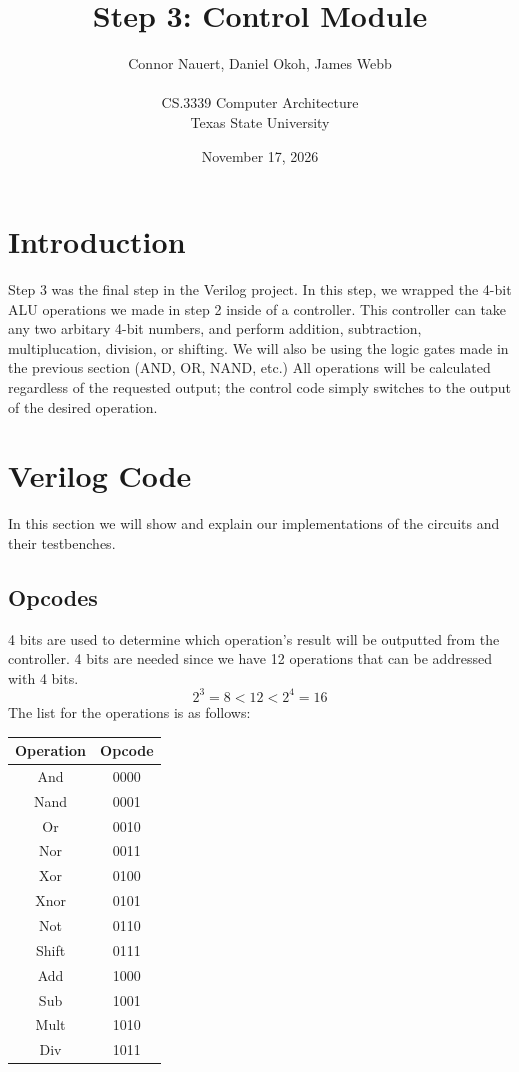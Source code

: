 \documentclass[12pt]{article}
\title{Step 3: Control Module}
\author{Connor Nauert, Daniel Okoh, James Webb\\
\AND\\
\AND
\AND
\AND
\AND
	CS.3339 Computer Architecture\\
\AND
	Texas State University\\
}
\date{November 17, 2026}
\begin{document}
\maketitle
\newpage
\thispagestyle{empty}


\newpage
\setcounter{page}{1}
\section{Introduction}
Step 3 was the final step in the Verilog project. In this step, we wrapped the
4-bit ALU operations we made in step 2 inside of a controller. This controller
can take any two arbitary 4-bit numbers, and perform addition, subtraction,
multiplucation, division, or shifting. We will also be using the logic gates
made in the previous section (AND, OR, NAND, etc.) All operations will
be calculated regardless of the requested output; the control code simply
switches to the output of the desired operation.

\section{Verilog Code}

In this section we will show and explain our implementations of the circuits and their testbenches.
\subsection{Opcodes}
4 bits are used to determine which operation's result will be outputted from the controller.
4 bits are needed since we have 12 operations that can be addressed with 4 bits.
$$2^3=8 < 12 < 2^4=16$$
The list for the operations is as follows:
\begin{center}
	\begin{tabular}{|c|c|}
		\hline
		Operation & Opcode \\
		\hline
		And & 0000 \\
		\hline
		Nand & 0001 \\
		\hline
		Or & 0010 \\
		\hline
		Nor & 0011 \\
		\hline
		Xor & 0100 \\
		\hline
		Xnor & 0101 \\
		\hline
		Not & 0110 \\
		\hline
		Shift & 0111 \\
		\hline
		Add & 1000 \\
		\hline
		Sub & 1001 \\
		\hline
		Mult & 1010 \\
		\hline
		Div & 1011 \\
		\hline
	\end{tabular}
\end{center}
\end{document}
